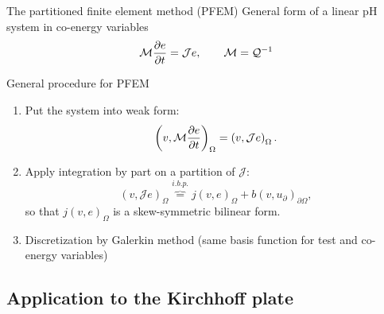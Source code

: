 \documentclass[aspectratio=169]{ISAE-Beamer}
\begin{document}
\begin{frame}{The partitioned finite element method (PFEM)}
General form of a linear pH system in co-energy variables
\begin{equation*}
\mathcal{M} \diffp{e}{t} = \mathcal{J} e, \qquad \mathcal{M} = \mathcal{Q}^{-1}
\end{equation*}

\begin{block}{General procedure for PFEM}
	\setlength{\abovedisplayskip}{1pt}
	\setlength{\belowdisplayskip}{1pt}
	\begin{enumerate}
		\item Put the system into weak form:
		\begin{equation*}
		\left(v, \mathcal{M} \diffp{e}{t} \right)_{\Omega} = \left(v, \mathcal{J} e \right)_{\Omega}.
		\end{equation*}
		\item Apply integration by part on a partition of $\mathcal{J}$:
		\begin{equation*}
		\left(v, \mathcal{J} e \right)_{\Omega} \overbrace{=}^{i.b.p.} j(v, e)_{\Omega} + b(v, u_\partial)_{\partial \Omega},
		\end{equation*}
		so that $j(v, e)_{\Omega}$ is a skew-symmetric bilinear form.
		\item Discretization by Galerkin method (same basis function for test and co-energy variables)
	\end{enumerate}
\end{block}
\end{frame}

\subsection{Application to the Kirchhoff plate}
\end{document}
